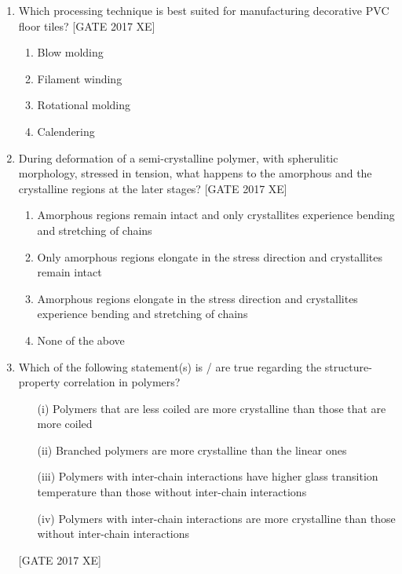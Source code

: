 \documentclass[journal,12pt,onecolumn]{IEEEtran}
\theoremstyle{remark}
\begin{document}
\begin{enumerate}
\begin{multicols}{2}
\begin{enumerate}
    \item Only i
    \item Only ii
    \item Both i and ii
    \item Neither i nor ii
\end{enumerate}
\end{multicols}
\item Which processing technique is best suited for manufacturing decorative PVC floor tiles?  
\hfill [GATE 2017 XE]

\begin{multicols}{2}
\begin{enumerate}
    \item Blow molding
    \item Filament winding
    \item Rotational molding
    \item Calendering
\end{enumerate}
\end{multicols}

\item During deformation of a semi-crystalline polymer, with spherulitic morphology, stressed in tension, what happens to the amorphous and the crystalline regions at the later stages?  
\hfill [GATE 2017 XE]

\begin{multicols}{2}
\begin{enumerate}
    \item Amorphous regions remain intact and only crystallites experience bending and stretching of chains
    \item Only amorphous regions elongate in the stress direction and crystallites remain intact
    \item Amorphous regions elongate in the stress direction and crystallites experience bending and stretching of chains
    \item None of the above
\end{enumerate}
\end{multicols}

\item Which of the following statement(s) is / are true regarding the structure-property correlation in polymers?  
\begin{enumerate}
    \item[(i)] Polymers that are less coiled are more crystalline than those that are more coiled  
    \item[(ii)] Branched polymers are more crystalline than the linear ones  
    \item[(iii)] Polymers with inter-chain interactions have higher glass transition temperature than those without inter-chain interactions  
    \item[(iv)] Polymers with inter-chain interactions are more crystalline than those without inter-chain interactions  
\end{enumerate}
\hfill [GATE 2017 XE]


\end{enumerate}
\end{document}
